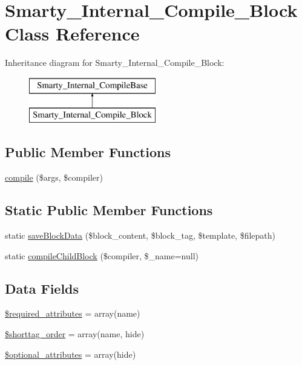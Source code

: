 \hypertarget{class_smarty___internal___compile___block}{}\section{Smarty\+\_\+\+Internal\+\_\+\+Compile\+\_\+\+Block Class Reference}
\label{class_smarty___internal___compile___block}
Inheritance diagram for Smarty\+\_\+\+Internal\+\_\+\+Compile\+\_\+\+Block\+:\begin{figure}[H]
\begin{center}
\leavevmode
\includegraphics[height=2.000000cm]{class_smarty___internal___compile___block}
\end{center}
\end{figure}
\subsection*{Public Member Functions}
\begin{DoxyCompactItemize}
\item 
\hyperlink{class_smarty___internal___compile___block_ad72fac0effa74aadee9b5ef6aed5f69f}{compile} (\$args, \$compiler)
\end{DoxyCompactItemize}
\subsection*{Static Public Member Functions}
\begin{DoxyCompactItemize}
\item 
static \hyperlink{class_smarty___internal___compile___block_acb31e419a8478145b6f3a74cd206de5e}{save\+Block\+Data} (\$block\+\_\+content, \$block\+\_\+tag, \$template, \$filepath)
\item 
static \hyperlink{class_smarty___internal___compile___block_a7128c13f7a4701e330469a56a90335ac}{compile\+Child\+Block} (\$compiler, \$\+\_\+name=null)
\end{DoxyCompactItemize}
\subsection*{Data Fields}
\begin{DoxyCompactItemize}
\item 
\hyperlink{class_smarty___internal___compile___block_ae799507d5461de485f3a618abeecea95}{\$required\+\_\+attributes} = array(\textquotesingle{}name\textquotesingle{})
\item 
\hyperlink{class_smarty___internal___compile___block_a2ccb25269c3a92e8c4796c7ef23725e6}{\$shorttag\+\_\+order} = array(\textquotesingle{}name\textquotesingle{}, \textquotesingle{}hide\textquotesingle{})
\item 
\hyperlink{class_smarty___internal___compile___block_a899d1eb4a6fecbd6ce696adb171c80a4}{\$optional\+\_\+attributes} = array(\textquotesingle{}hide\textquotesingle{})
\end{DoxyCompactItemize}


